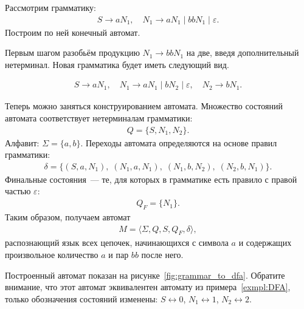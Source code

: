 \begin{example}
Рассмотрим грамматику:
\begin{align*}
    S \to a N_1, \quad
    N_1 \to a N_1 \mid b b N_1 \mid \varepsilon.
\end{align*}
Построим по ней конечный автомат.

Первым шагом разобьём продукцию $N_1 \to b b N_1$ на две, введя дополнительный нетерминал.
Новая грамматика будет иметь следующий вид.

\begin{align*}
    S \to a N_1, \quad
    N_1 \to a N_1 \mid b N_2 \mid \varepsilon , \quad
    N_2 \to b N_1.
\end{align*}

Теперь можно заняться конструированием автомата.
Множество состояний автомата соответствует нетерминалам грамматики:
\begin{align*}
    Q = \{S, N_1, N_2\}.
\end{align*}
Алфавит: $\Sigma = \{a, b\}$.
Переходы автомата определяются на основе правил грамматики:
\begin{align*}
\delta = \{
(S, a, N_1),\;
(N_1, a, N_1),\;
(N_1, b, N_2),\;
(N_2, b, N_1)
\}.
\end{align*}
Финальные состояния~--- те, для которых в грамматике есть правило с правой частью $\varepsilon$:
\begin{align*}
Q_F = \{ N_1 \}.
\end{align*}
Таким образом, получаем автомат
\begin{align*}
M = \langle \Sigma, Q, S, Q_F, \delta \rangle,
\end{align*}
распознающий язык всех цепочек, начинающихся с символа $a$ и содержащих произвольное количество $a$ и пар $bb$ после него.

Построенный автомат показан на рисунке~\ref{fig:grammar_to_dfa}. Обратите внимание, что этот автомат эквивалентен автомату из примера~\ref{exmpl:DFA}, только обозначения состояний изменены: $S \leftrightarrow 0$, $N_1 \leftrightarrow 1$, $N_2 \leftrightarrow 2$.
\end{example}
